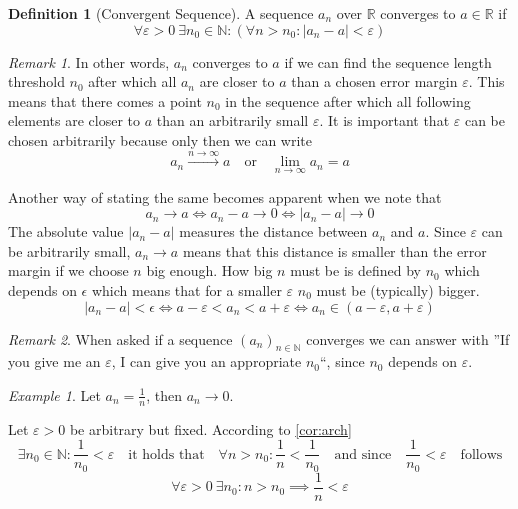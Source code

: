 \documentclass[english,titlepage]{uzhpub}
\theoremstyle{definition}
\newtheorem{definition}{Definition}[section]
\theoremstyle{plain}
\theoremstyle{remark}
\newtheorem*{remark}{Remark}
\theoremstyle{example}
\newtheorem*{example}{Example}
\begin{document}
   \begin{definition}[Convergent Sequence]
      A sequence \(a_n\) over \(\mathbb{R}\) converges to \(a \in \mathbb{R}\) if
      \[\forall \varepsilon > 0~\exists n_0 \in \mathbb{N}: (\forall n > n_0: |a_n - a| < \varepsilon)\]
   \end{definition}
   \begin{remark}
      In other words, \(a_n\) converges to \(a\) if we can find the sequence length threshold \(n_0\) after which all \(a_n\) are closer to \(a\) than a chosen error margin \(\varepsilon\).
      This means that there comes a point \(n_0\) in the sequence after which all following elements are closer to \(a\) than an arbitrarily small \(\varepsilon\).
      It is important that \(\varepsilon\) can be chosen arbitrarily because only then we can write
      \[a_n \xrightarrow{n \to \infty} a \quad\text{or}\quad \lim_{n \to \infty} a_n = a\]

      Another way of stating the same becomes apparent when we note that
      \[a_n \to a \iff a_n - a \to 0 \iff |a_n - a| \to 0\]
      The absolute value \(|a_n - a|\) measures the distance between \(a_n\) and \(a\).
      Since \(\varepsilon\) can be arbitrarily small, \(a_n \to a\) means that this distance is smaller than the error margin if we choose \(n\) big enough.
      How big \(n\) must be is defined by \(n_0\) which depends on \(\epsilon\) which means that for a smaller \(\varepsilon\) \(n_0\) must be (typically) bigger.
      \[|a_n - a| < \epsilon \iff a - \varepsilon < a_n < a + \varepsilon \iff a_n \in (a - \varepsilon, a + \varepsilon)\]
   \end{remark}
   \begin{remark}
      When asked if a sequence \((a_n)_{n \in \mathbb{N}}\) converges we can answer with ''If you give me an \(\varepsilon\), I can give you an appropriate \(n_0\)``, since \(n_0\) depends on \(\varepsilon\).
   \end{remark}
   \begin{example}
      Let \(a_n = \frac{1}{n}\), then \(a_n \to 0\).

      Let \(\varepsilon > 0\) be arbitrary but fixed.
      According to \cref{cor:arch}
      \[\exists n_0 \in \mathbb{N}: \frac{1}{n_0} < \varepsilon \quad\text{it holds that}\quad \forall n > n_0: \frac{1}{n} < \frac{1}{n_0} \quad\text{and since}\quad \frac{1}{n_0} < \varepsilon \quad\text{follows}\]
      \[\forall \varepsilon > 0~\exists n_0: n > n_0 \implies \frac{1}{n} < \varepsilon\]

      \begin{center}
         
      \end{center}
   \end{example}
\end{document}
